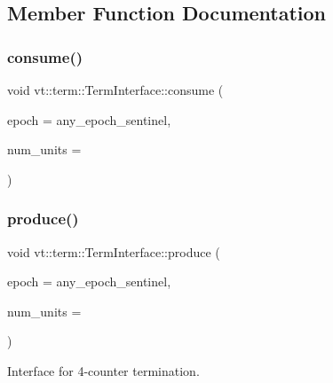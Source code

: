 \subsection{Member Function Documentation}
\mbox{\label{structvt_1_1term_1_1_term_interface_a6e117a0857540c82133b7a10bfa5d39e}} 
\subsubsection{\texorpdfstring{consume()}{consume()}}
{\footnotesize\ttfamily void vt\+::term\+::\+Term\+Interface\+::consume (\begin{DoxyParamCaption}\item[{\hyperlink{namespacevt_a985a5adf291c34a3ca263b3378388236}{Epoch\+Type}}]{epoch = {\ttfamily any\+\_\+epoch\+\_\+sentinel},  }\item[{\hyperlink{namespacevt_1_1term_a4fd378cdb0c36683afc1b3399d685f7f}{Term\+Counter\+Type} const \&}]{num\+\_\+units = {} }\end{DoxyParamCaption})}

\mbox{\label{structvt_1_1term_1_1_term_interface_a38661883a7d3a721e50c6ab2d9e10edb}} 
\subsubsection{\texorpdfstring{produce()}{produce()}}
{\footnotesize\ttfamily void vt\+::term\+::\+Term\+Interface\+::produce (\begin{DoxyParamCaption}\item[{\hyperlink{namespacevt_a985a5adf291c34a3ca263b3378388236}{Epoch\+Type}}]{epoch = {\ttfamily any\+\_\+epoch\+\_\+sentinel},  }\item[{\hyperlink{namespacevt_1_1term_a4fd378cdb0c36683afc1b3399d685f7f}{Term\+Counter\+Type} const \&}]{num\+\_\+units = {} }\end{DoxyParamCaption})}



Interface for 4-\/counter termination. 

